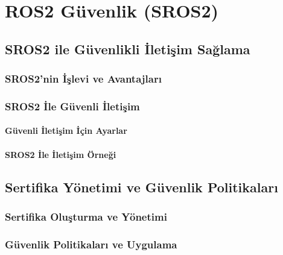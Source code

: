 \chapter{ROS2 Güvenlik (SROS2)}

\section{SROS2 ile Güvenlikli İletişim Sağlama}
\subsection{SROS2'nin İşlevi ve Avantajları}
\lipsum[1] %

\subsection{SROS2 İle Güvenli İletişim}
\lipsum[2] %

\subsubsection{Güvenli İletişim İçin Ayarlar}
\lipsum[3] %

\subsubsection{SROS2 İle İletişim Örneği}
\lipsum[4] %

\section{Sertifika Yönetimi ve Güvenlik Politikaları}
\subsection{Sertifika Oluşturma ve Yönetimi}
\lipsum[5] %

\subsection{Güvenlik Politikaları ve Uygulama}
\lipsum[6] %

